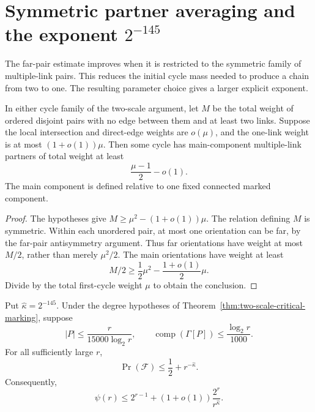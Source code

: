 \section{Symmetric partner averaging and the exponent $2^{-145}$}
\label{sec:two-scale-symmetric-pairs}

The far-pair estimate improves when it is restricted to the symmetric family of multiple-link pairs.
This reduces the initial cycle mass needed to produce a chain from two to one.
The resulting parameter choice gives a larger explicit exponent.

\begin{lemma}
\label{lem:symmetric-partner-averaging}
In either cycle family of the two-scale argument, let $M$ be the total weight of ordered disjoint pairs
with no edge between them and at least two links.
Suppose the local intersection and direct-edge weights are $o(\mu)$, and the one-link weight is at most $(1+o(1))\mu$.
Then some cycle has main-component multiple-link partners of total weight at least
\[
 \frac{\mu-1}{2}-o(1).
\]
The main component is defined relative to one fixed connected marked component.
\end{lemma}

\begin{proof}
The hypotheses give $M\ge\mu^2-(1+o(1))\mu$.
The relation defining $M$ is symmetric.
Within each unordered pair, at most one orientation can be far, by the far-pair antisymmetry argument.
Thus far orientations have weight at most $M/2$, rather than merely $\mu^2/2$.
The main orientations have weight at least
\[
 M/2\ge\frac12\mu^2-\frac{1+o(1)}2\mu.
\]
Divide by the total first-cycle weight $\mu$ to obtain the conclusion.
\end{proof}

\begin{theorem}
\label{thm:two-scale-exponent-145}
Put $\widehat\kappa=2^{-145}$.
Under the degree hypotheses of Theorem~\ref{thm:two-scale-critical-marking}, suppose
\[
 |P|\le\frac{r}{15000\log_2r},\qquad
 \operatorname{comp}(\Gamma[P])\le\frac{\log_2r}{1000}.
\]
For all sufficiently large $r$,
\[
 \Pr(\mathcal F)\le\frac12+r^{-\widehat\kappa}.
\]
Consequently,
\[
 \psi(r)\le2^{r-1}+(1+o(1))\frac{2^r}{r^{\widehat\kappa}}.
\]
\end{theorem}

